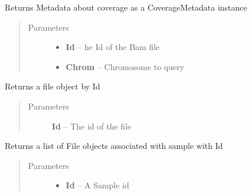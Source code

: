 \documentclass[letterpaper,10pt,english]{sphinxmanual}
\begin{document}
\begin{fulllineitems}
\begin{fulllineitems}
\label{Available modules:BaseSpacePy.api.BaseSpaceAPI.BaseSpaceAPI.getCoverageMetaInfo}
Returns Metadata about coverage as a CoverageMetadata instance
\begin{quote}\begin{description}
\item[{Parameters}] \leavevmode\begin{itemize}
\item {} 
\textbf{Id} -- he Id of the Bam file

\item {} 
\textbf{Chrom} -- Chromosome to query

\end{itemize}

\end{description}\end{quote}

\end{fulllineitems}


\begin{fulllineitems}
\label{Available modules:BaseSpacePy.api.BaseSpaceAPI.BaseSpaceAPI.getFileById}
Returns a file object by Id
\begin{quote}\begin{description}
\item[{Parameters}] \leavevmode
\textbf{Id} -- The id of the file

\end{description}\end{quote}

\end{fulllineitems}


\begin{fulllineitems}
\label{Available modules:BaseSpacePy.api.BaseSpaceAPI.BaseSpaceAPI.getFilesBySample}
Returns a list of File objects associated with sample with Id
\begin{quote}\begin{description}
\item[{Parameters}] \leavevmode\begin{itemize}
\item {} 
\textbf{Id} -- A Sample id


\end{itemize}
\end{description}
\end{quote}
\end{fulllineitems}
\end{fulllineitems}
\end{document}
